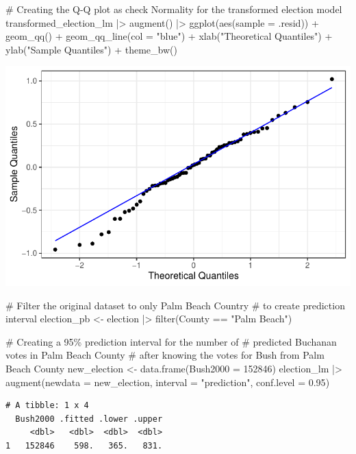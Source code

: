 \documentclass[
  letterpaper,
  DIV=11,
  numbers=noendperiod]{scrartcl}
\newenvironment{Shaded}{\begin{snugshade}}{\end{snugshade}}
\newcommand{\AttributeTok}[1]{\textcolor[rgb]{0.40,0.45,0.13}{#1}}
\newcommand{\CommentTok}[1]{\textcolor[rgb]{0.37,0.37,0.37}{#1}}
\newcommand{\DecValTok}[1]{\textcolor[rgb]{0.68,0.00,0.00}{#1}}
\newcommand{\FloatTok}[1]{\textcolor[rgb]{0.68,0.00,0.00}{#1}}
\newcommand{\FunctionTok}[1]{\textcolor[rgb]{0.28,0.35,0.67}{#1}}
\newcommand{\NormalTok}[1]{\textcolor[rgb]{0.00,0.23,0.31}{#1}}
\newcommand{\OtherTok}[1]{\textcolor[rgb]{0.00,0.23,0.31}{#1}}
\newcommand{\SpecialCharTok}[1]{\textcolor[rgb]{0.37,0.37,0.37}{#1}}
\newcommand{\StringTok}[1]{\textcolor[rgb]{0.13,0.47,0.30}{#1}}
\begin{document}
\begin{Shaded}
\begin{Highlighting}[]
\CommentTok{\# Creating the Q{-}Q plot as check Normality for the transformed election model}
\NormalTok{transformed\_election\_lm }\SpecialCharTok{|\textgreater{}}
  \FunctionTok{augment}\NormalTok{() }\SpecialCharTok{|\textgreater{}}
  \FunctionTok{ggplot}\NormalTok{(}\FunctionTok{aes}\NormalTok{(}\AttributeTok{sample =}\NormalTok{ .resid)) }\SpecialCharTok{+}
  \FunctionTok{geom\_qq}\NormalTok{() }\SpecialCharTok{+}
  \FunctionTok{geom\_qq\_line}\NormalTok{(}\AttributeTok{col =} \StringTok{"blue"}\NormalTok{) }\SpecialCharTok{+}
  \FunctionTok{xlab}\NormalTok{(}\StringTok{"Theoretical Quantiles"}\NormalTok{) }\SpecialCharTok{+}
  \FunctionTok{ylab}\NormalTok{(}\StringTok{"Sample Quantiles"}\NormalTok{) }\SpecialCharTok{+}
  \FunctionTok{theme\_bw}\NormalTok{()}
\end{Highlighting}
\end{Shaded}

\includegraphics{SDS-291-case-study-1_files/figure-pdf/unnamed-chunk-4-5.pdf}

\begin{Shaded}
\begin{Highlighting}[]
\CommentTok{\# Filter the original dataset to only Palm Beach Country}
\CommentTok{\# to create prediction interval}
\NormalTok{election\_pb }\OtherTok{\textless{}{-}}\NormalTok{ election }\SpecialCharTok{|\textgreater{}} \FunctionTok{filter}\NormalTok{(County }\SpecialCharTok{==} \StringTok{"Palm Beach"}\NormalTok{)}

\CommentTok{\# Creating a 95\% prediction interval for the number of}
\CommentTok{\# predicted Buchanan votes in Palm Beach County}
\CommentTok{\# after knowing the votes for Bush from Palm Beach County}
\NormalTok{new\_election }\OtherTok{\textless{}{-}} \FunctionTok{data.frame}\NormalTok{(}\AttributeTok{Bush2000 =} \DecValTok{152846}\NormalTok{)}
\NormalTok{election\_lm }\SpecialCharTok{|\textgreater{}}
  \FunctionTok{augment}\NormalTok{(}\AttributeTok{newdata =}\NormalTok{ new\_election,}
          \AttributeTok{interval =} \StringTok{"prediction"}\NormalTok{,}
          \AttributeTok{conf.level =} \FloatTok{0.95}\NormalTok{)}
\end{Highlighting}
\end{Shaded}

\begin{verbatim}
# A tibble: 1 x 4
  Bush2000 .fitted .lower .upper
     <dbl>   <dbl>  <dbl>  <dbl>
1   152846    598.   365.   831.
\end{verbatim}
\end{document}
